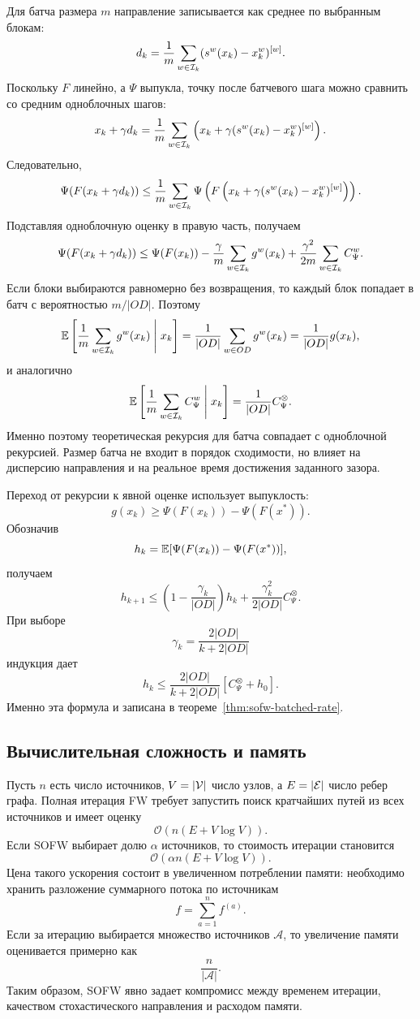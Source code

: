 Для батча размера $m$ направление записывается как среднее по выбранным блокам:
\[
    d_k
    =
    \frac{1}{m}
    \sum_{w\in\mathcal{I}_k}
    (s^w(x_k)-x_k^w)^{[w]}.
\]
Поскольку $F$ линейно, а $\Psi$ выпукла, точку после батчевого шага можно сравнить со
средним одноблочных шагов:
\[
    x_k+\gamma d_k
    =
    \frac{1}{m}
    \sum_{w\in\mathcal{I}_k}
    \left(
        x_k+\gamma(s^w(x_k)-x_k^w)^{[w]}
    \right).
\]
Следовательно,
\[
    \Psi(F(x_k+\gamma d_k))
    \leq
    \frac{1}{m}
    \sum_{w\in\mathcal{I}_k}
    \Psi\left(
        F\left(x_k+\gamma(s^w(x_k)-x_k^w)^{[w]}\right)
    \right).
\]
Подставляя одноблочную оценку в правую часть, получаем
\[
    \Psi(F(x_k+\gamma d_k))
    \leq
    \Psi(F(x_k))
    -
    \frac{\gamma}{m}
    \sum_{w\in\mathcal{I}_k}g^w(x_k)
    +
    \frac{\gamma^2}{2m}
    \sum_{w\in\mathcal{I}_k}C_\Psi^w.
\]
Если блоки выбираются равномерно без возвращения, то каждый блок попадает в батч с
вероятностью $m/|OD|$.
Поэтому
\[
    \mathbb{E}\left[
        \frac{1}{m}\sum_{w\in\mathcal{I}_k}g^w(x_k)
        \;\middle|\;x_k
    \right]
    =
    \frac{1}{|OD|}\sum_{w\in OD}g^w(x_k)
    =
    \frac{1}{|OD|}g(x_k),
\]
и аналогично
\[
    \mathbb{E}\left[
        \frac{1}{m}\sum_{w\in\mathcal{I}_k}C_\Psi^w
        \;\middle|\;x_k
    \right]
    =
    \frac{1}{|OD|}C_\Psi^\otimes.
\]
Именно поэтому теоретическая рекурсия для батча совпадает с одноблочной рекурсией.
Размер батча не входит в порядок сходимости, но влияет на дисперсию направления и на
реальное время достижения заданного зазора.

Переход от рекурсии к явной оценке использует выпуклость:
\[
    g(x_k)\geq \Psi(F(x_k))-\Psi(F(x^\ast)).
\]
Обозначив
\[
    h_k=\mathbb{E}[\Psi(F(x_k))-\Psi(F(x^\ast))],
\]
получаем
\[
    h_{k+1}
    \leq
    \left(1-\frac{\gamma_k}{|OD|}\right)h_k
    +
    \frac{\gamma_k^2}{2|OD|}C_\Psi^\otimes.
\]
При выборе
\[
    \gamma_k=\frac{2|OD|}{k+2|OD|}
\]
индукция дает
\[
    h_k
    \leq
    \frac{2|OD|}{k+2|OD|}
    \left[
        C_\Psi^\otimes+h_0
    \right].
\]
Именно эта формула и записана в теореме~\ref{thm:sofw-batched-rate}.

\subsection{Вычислительная сложность и память}

Пусть $n$ есть число источников, $V=|\mathcal{V}|$ число узлов, а $E=|\mathcal{E}|$ число ребер графа.
Полная итерация FW требует запустить поиск кратчайших путей из всех источников и имеет оценку
\[
    \mathcal{O}\left(n(E+V\log V)\right).
\]
Если SOFW выбирает долю $\alpha$ источников, то стоимость итерации становится
\[
    \mathcal{O}\left(\alpha n(E+V\log V)\right).
\]
Цена такого ускорения состоит в увеличенном потреблении памяти: необходимо хранить разложение суммарного потока по источникам
\[
    f=\sum_{a=1}^{n}f^{(a)}.
\]
Если за итерацию выбирается множество источников $\mathcal{A}$, то увеличение памяти оценивается примерно как
\[
    \frac{n}{|\mathcal{A}|}.
\]
Таким образом, SOFW явно задает компромисс между временем итерации, качеством стохастического направления и расходом памяти.

